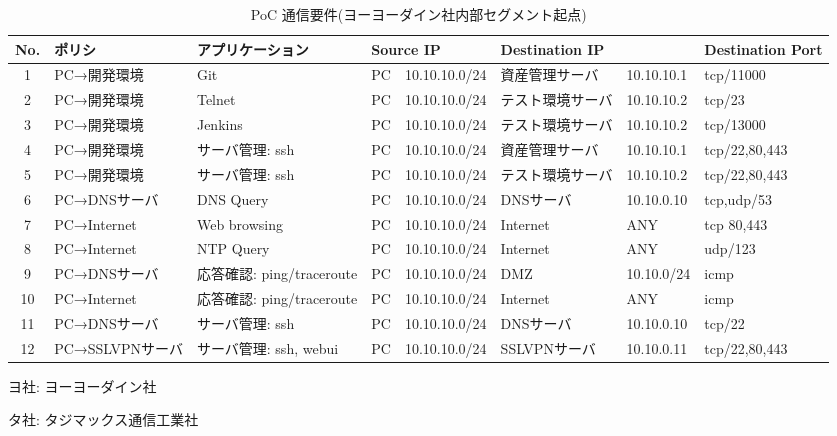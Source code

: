 \begin{landscape}
 \begin{table}[h]
  \centering
  \caption{PoC 通信要件(ヨーヨーダイン社内部セグメント起点)}
  \label{tab:poc-requires-yo-int}
  \begin{threeparttable}
   \begin{tabularx}{\linewidth}{c|X|X|X|X|X|X|X}
\hline
No. & ポリシ & アプリケーション & \multicolumn{2}{|l|}{Source IP} & \multicolumn{2}{l|}{Destination IP} & Destination Port \\
\hline
\hline
1 & PC→開発環境 & Git & PC & 10.10.10.0/24 & 資産管理サーバ & 10.10.10.1 & tcp/11000 \\ \hline
2 & PC→開発環境 & Telnet & PC & 10.10.10.0/24 & テスト環境サーバ & 10.10.10.2 & tcp/23 \\ \hline
3 & PC→開発環境 & Jenkins & PC & 10.10.10.0/24 & テスト環境サーバ & 10.10.10.2 & tcp/13000 \\ \hline
4 & PC→開発環境 & サーバ管理: ssh & PC & 10.10.10.0/24 & 資産管理サーバ & 10.10.10.1 & tcp/22,80,443 \\ \hline
5 & PC→開発環境 & サーバ管理: ssh & PC & 10.10.10.0/24 & テスト環境サーバ & 10.10.10.2 & tcp/22,80,443 \\ \hline
6 & PC→DNSサーバ & DNS Query & PC & 10.10.10.0/24 & DNSサーバ & 10.10.0.10 & tcp,udp/53 \\ \hline
7 & PC→Internet & Web browsing & PC & 10.10.10.0/24 & Internet & ANY & tcp 80,443 \\ \hline
8 & PC→Internet & NTP Query & PC & 10.10.10.0/24 & Internet & ANY & udp/123 \\ \hline
9 & PC→DNSサーバ & 応答確認: ping/traceroute & PC & 10.10.10.0/24 & DMZ & 10.10.0/24 & icmp \\ \hline
10 & PC→Internet & 応答確認: ping/traceroute & PC & 10.10.10.0/24 & Internet & ANY & icmp \\ \hline
11 & PC→DNSサーバ & サーバ管理: ssh & PC & 10.10.10.0/24 & DNSサーバ & 10.10.0.10 & tcp/22 \\ \hline
12 & PC→SSLVPNサーバ & サーバ管理: ssh, webui & PC & 10.10.10.0/24 & SSLVPNサーバ & 10.10.0.11 & tcp/22,80,443 \\ \hline
   \end{tabularx}
   \begin{tablenotes}
    \footnotesize
    \item ヨ社: ヨーヨーダイン社
    \item タ社: タジマックス通信工業社
   \end{tablenotes}
  \end{threeparttable}
 \end{table}
\end{landscape}

